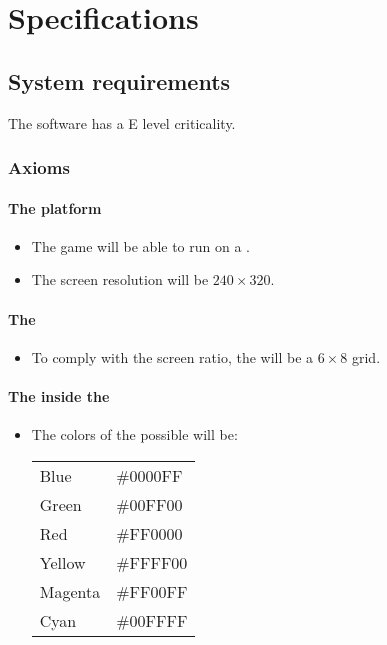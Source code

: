 \section{Specifications}

\subsection{System requirements}

The software has a E level criticality.

\subsubsection{Axioms}

\paragraph{The platform}

\begin{itemize}
\item The game will be able to run on a \stmdb.
\item The screen resolution will be $240\times 320$.
\end{itemize}

\paragraph{The \grid}

\begin{itemize}

\item To comply with the screen ratio, the \grid will be a $6\times 8$ grid.

\end{itemize}

\paragraph{The \sqs inside the \grid}

\begin{itemize}
\item The colors of the possible \sqs will be:

\begin{tabular}{ll}

Blue    & \#0000FF \\
Green   & \#00FF00 \\
Red     & \#FF0000 \\
Yellow  & \#FFFF00 \\
Magenta & \#FF00FF \\
Cyan    & \#00FFFF \\

\end{tabular}
\end{itemize}

